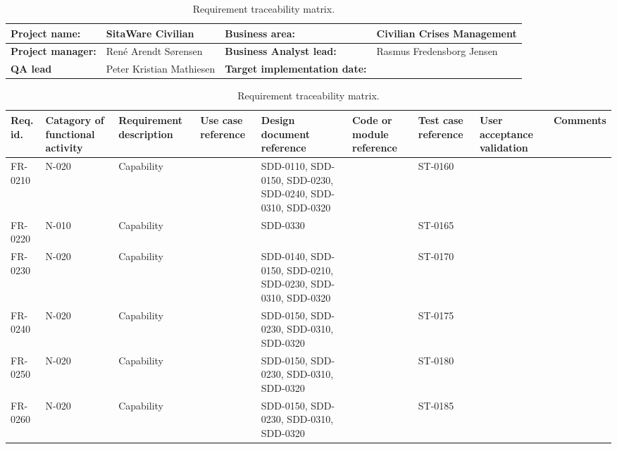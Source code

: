 \begin{sidewaystable}
\begin{table}[H]
\begin{tabular}{|l|l|l|l|}
\hline
 \textbf{Project name:} & SitaWare Civilian & \textbf{Business area:}  & Civilian Crises Management\\ \hline
 \textbf{Project manager:} & René Arendt Sørensen & \textbf{Business Analyst lead:} & Rasmus Fredensborg  Jensen\\ \hline
 \textbf{QA lead} & Peter Kristian Mathiesen & \textbf{Target implementation date:}  & \\ \hline
\end{tabular}	
\begin{tabular}{|p{2cm}|p{2cm}|p{3cm}|p{2cm}|p{2cm}|p{2cm}|p{2cm}|p{2cm}|p{2cm}|}
\hline
 Req. id. & Catagory of functional activity & Requirement description  & Use case reference & Design document reference & Code or module reference & Test case reference & User acceptance validation & Comments\\ \hline
 FR-0210 & N-020 & Capability & &SDD-0110,  SDD-0150, SDD-0230, SDD-0240, SDD-0310, SDD-0320& & ST-0160& &\\ \hline
 FR-0220 & N-010 & Capability & &SDD-0330 & & ST-0165& &\\ \hline
 FR-0230 & N-020 & Capability & &SDD-0140, SDD-0150, SDD-0210, SDD-0230, SDD-0310, SDD-0320& & ST-0170& &\\ \hline
 FR-0240 & N-020 & Capability & &SDD-0150, SDD-0230, SDD-0310, SDD-0320& & ST-0175& &\\ \hline
 FR-0250 & N-020 & Capability & &SDD-0150, SDD-0230, SDD-0310, SDD-0320 & & ST-0180& &\\ \hline
 FR-0260 & N-020 & Capability & &SDD-0150, SDD-0230, SDD-0310, SDD-0320 & & ST-0185& &\\ \hline

\end{tabular}	
\caption{Requirement traceability matrix.}
\end{table}

\end{sidewaystable}

